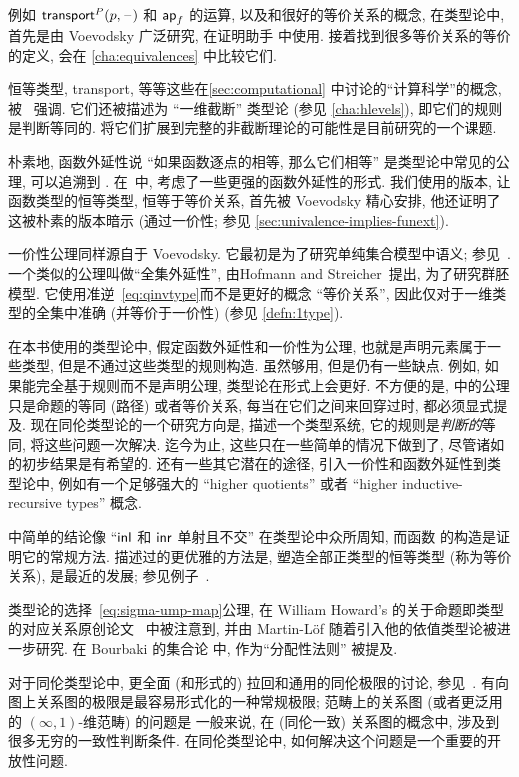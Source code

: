 %
例如 $\mathsf{transport}^{P}(p,\mathord{\hspace{1pt}\text{--}\hspace{1pt}})$ 和 $\mathsf{ap}_{f}$ 的运算, 以及和很好的等价关系的概念, 在类型论中, 首先是由 Voevodsky 广泛研究, 在证明助手 \Coq 中使用.
接着找到很多等价关系的等价的定义, 会在 \cref{cha:equivalences} 中比较它们.

恒等类型, transport, 等等这些在\cref{sec:computational} 中讨论的``计算科学''的概念, 被~\cite{lh:canonicity} 强调.
它们还被描述为 ``一维截断'' 类型论 (参见 \cref{cha:hlevels}), 即它们的规则是判断等同的.
将它们扩展到完整的非截断理论的可能性是目前研究的一个课题.

%
朴素地, 函数外延性说 ``如果函数逐点的相等, 那么它们相等'' 是类型论中常见的公理, 可以追溯到 \cite{PM2}.
在~\cite{garner:depprod}中, 考虑了一些更强的函数外延性的形式.
我们使用的版本, 让函数类型的恒等类型, 恒等于等价关系, 首先被 Voevodsky 精心安排, 他还证明了这被朴素的版本暗示 (通过一价性; 参见 \cref{sec:univalence-implies-funext}).

%
一价性公理同样源自于 Voevodsky.
它最初是为了研究单纯集合模型中语义; 参见~\cite{klv:ssetmodel}.
一个类似的公理叫做``全集外延性'', 由Hofmann and Streicher~\cite{hs:gpd-typethy}提出, 为了研究群胚模型.
它使用准逆~\eqref{eq:qinvtype}而不是更好的概念 ``等价关系'', 因此仅对于一维类型的全集中准确 (并等价于一价性) (参见 \cref{defn:1type}).

在本书使用的类型论中, 假定函数外延性和一价性为公理, 也就是声明元素属于一些类型, 但是不通过这些类型的规则构造.
虽然够用, 但是仍有一些缺点.
例如, 如果能完全基于规则而不是声明公理, 类型论在形式上会更好.
不方便的是,  中的公理只是命题的等同 (路径) 或者等价关系, 每当在它们之间来回穿过时, 都必须显式提及.
现在同伦类型论的一个研究方向是, 描述一个类型系统, 它的规则是\emph{判断的}等同, 将这些问题一次解决.
迄今为止, 这些只在一些简单的情况下做到了, 尽管诸如~\cite{lh:canonicity} 的初步结果是有希望的.
还有一些其它潜在的途径, 引入一价性和函数外延性到类型论中, 例如有一个足够强大的 ``higher quotients'' 或者 ``higher inductive-recursive types'' 概念.

 中简单的结论像 ``${\mathsf{inl}}$ 和 ${\mathsf{inr}}$ 单射且不交'' 在类型论中众所周知, 而函数 \encode 的构造是证明它的常规方法.
描述过的更优雅的方法是, 塑造全部正类型的恒等类型 (称为等价关系), 是最近的发展; 参见例子~\cite{ls:pi1s1}.

%
类型论的选择~\eqref{eq:sigma-ump-map}公理, 在 William Howard's 的关于命题即类型的对应关系原创论文~\cite{howard:pat} 中被注意到, 并由 Martin-L\"of 随着引入他的依值类型论被进一步研究.
在 Bourbaki 的集合论 \cite{Bourbaki} 中, 作为``分配性法则'' 被提及.%

对于同伦类型论中, 更全面 (和形式的) 拉回和通用的同伦极限的讨论, 参见~\cite{AKL13}.
有向图上关系图的极限是最容易形式化的一种常规极限; 范畴上的关系图 (或者更泛用的 $(\infty,1)$-维范畴) 的问题是
%
%
一般来说, 在 (同伦一致) 关系图的概念中, 涉及到很多无穷的一致性判断条件.
在同伦类型论中, 如何解决这个问题是一个重要的开放性问题.